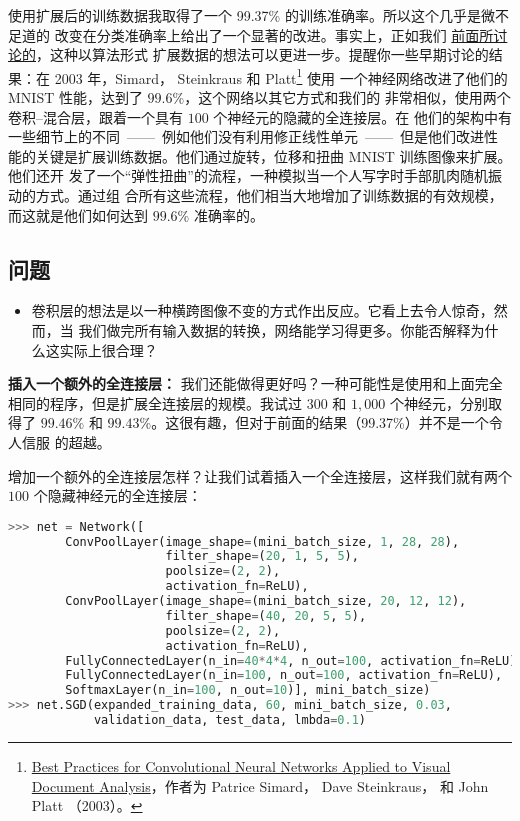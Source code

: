 使用扩展后的训练数据我取得了一个 99.37\% 的训练准确率。所以这个几乎是微不足道的
改变在分类准确率上给出了一个显著的改进。事实上，正如我们%
\hyperref[sec:other_techniques_for_regularization]{前面所讨论的}，这种以算法形式
扩展数据的想法可以更进一步。提醒你一些早期讨论的结果：在 2003 年，Simard，
Steinkraus 和
Platt\footnote{\href{http://dx.doi.org/10.1109/ICDAR.2003.1227801}{Best
    Practices for Convolutional Neural Networks Applied to Visual Document
    Analysis}，作者为 Patrice Simard， Dave Steinkraus， 和 John Platt （2003）。} 使用
一个神经网络改进了他们的 MNIST 性能，达到了 $99.6$\%，这个网络以其它方式和我们的
非常相似，使用两个卷积--混合层，跟着一个具有 $100$ 个神经元的隐藏的全连接层。在
他们的架构中有一些细节上的不同~——~例如他们没有利用修正线性单元~——~但是他们改进性
能的关键是扩展训练数据。他们通过旋转，位移和扭曲 MNIST 训练图像来扩展。他们还开
发了一个“弹性扭曲”的流程，一种模拟当一个人写字时手部肌肉随机振动的方式。通过组
合所有这些流程，他们相当大地增加了训练数据的有效规模，而这就是他们如何达到
$99.6$\% 准确率的。

\subsection*{问题}

\begin{itemize}
\item 卷积层的想法是以一种横跨图像不变的方式作出反应。它看上去令人惊奇，然而，当
  我们做完所有输入数据的转换，网络能学习得更多。你能否解释为什么这实际上很合理？
\end{itemize}

\textbf{插入一个额外的全连接层：} 我们还能做得更好吗？一种可能性是使用和上面完全
相同的程序，但是扩展全连接层的规模。我试过 $300$ 和 $1,000$ 个神经元，分别取得了
$99.46$\% 和 $99.43$\%。这很有趣，但对于前面的结果（99.37\%）并不是一个令人信服
的超越。

增加一个额外的全连接层怎样？让我们试着插入一个全连接层，这样我们就有两个 $100$
个隐藏神经元的全连接层：
\begin{lstlisting}[language=Python]
>>> net = Network([
        ConvPoolLayer(image_shape=(mini_batch_size, 1, 28, 28), 
                      filter_shape=(20, 1, 5, 5), 
                      poolsize=(2, 2), 
                      activation_fn=ReLU),
        ConvPoolLayer(image_shape=(mini_batch_size, 20, 12, 12), 
                      filter_shape=(40, 20, 5, 5), 
                      poolsize=(2, 2), 
                      activation_fn=ReLU),
        FullyConnectedLayer(n_in=40*4*4, n_out=100, activation_fn=ReLU),
        FullyConnectedLayer(n_in=100, n_out=100, activation_fn=ReLU),
        SoftmaxLayer(n_in=100, n_out=10)], mini_batch_size)
>>> net.SGD(expanded_training_data, 60, mini_batch_size, 0.03, 
            validation_data, test_data, lmbda=0.1)
\end{lstlisting}

